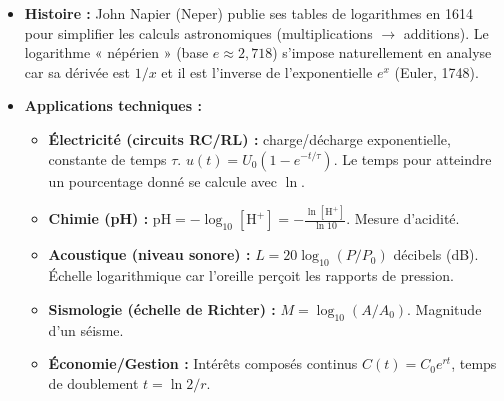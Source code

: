 \documentclass[11pt]{article}
\begin{document}
\begin{savaistu}
\begin{itemize}
\item \textbf{Histoire :} John Napier (Neper) publie ses tables de logarithmes en 1614 pour simplifier les calculs astronomiques (multiplications $\to$ additions). Le logarithme « népérien » (base $e \approx 2,718$) s'impose naturellement en analyse car sa dérivée est $1/x$ et il est l'inverse de l'exponentielle $e^x$ (Euler, 1748).
\item \textbf{Applications techniques :}
\begin{itemize}
\item \textbf{Électricité (circuits RC/RL) :} charge/décharge exponentielle, constante de temps $\tau$. $u(t)=U_0(1-e^{-t/\tau})$. Le temps pour atteindre un pourcentage donné se calcule avec $\ln$.
\item \textbf{Chimie (pH) :} $\mathrm{pH} = -\log_{10}[\mathrm{H}^+] = -\frac{\ln[\mathrm{H}^+]}{\ln 10}$. Mesure d'acidité.
\item \textbf{Acoustique (niveau sonore) :} $L = 20\log_{10}(P/P_0)$ décibels (dB). Échelle logarithmique car l'oreille perçoit les rapports de pression.
\item \textbf{Sismologie (échelle de Richter) :} $M = \log_{10}(A/A_0)$. Magnitude d'un séisme.
\item \textbf{Économie/Gestion :} Intérêts composés continus $C(t)=C_0 e^{rt}$, temps de doublement $t = \ln 2 / r$.
\end{itemize}
\end{itemize}
\end{savaistu}
\end{document}
